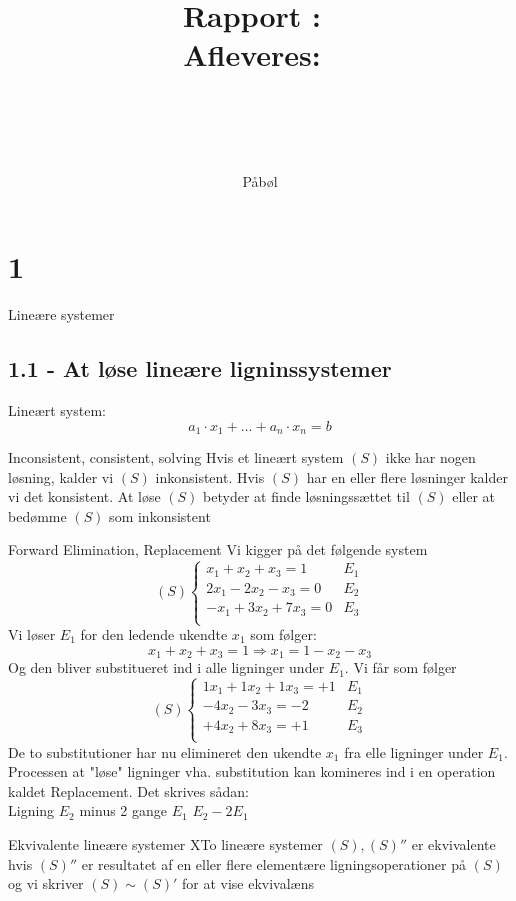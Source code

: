 \documentclass[a4paper,fleqn]{article}
\title{Rapport}
\author{P\aa b\o l}
\title{
	\vspace{2in}
	\textmd{\textbf{\hmwkClass:\ \hmwkTitle}}\\
	\normalsize\vspace{0.1in}\small{Afleveres:\ \hmwkDueDate}\\
	\vspace{0.1in}\large{\textit{\hmwkClassInstructor}}\\
	\normalsize\vspace{0.5in} \hmwkProblem  \\
	\vspace{3in}
}
\author{\textbf{\hmwkAuthorName}}
\begin{document}
	\maketitle
	\newpage
	\tableofcontents
	\setcounter{page}{1}
	\section{1}{Lineære systemer}
	\subsection{1.1 - At løse lineære ligninssystemer}
	Lineært system: \[ a_1 \cdot x_1 + \dots + a_n \cdot x_n = b \]
	\begin{definition}{Inconsistent, consistent, solving}{}
		Hvis et lineært system $(S)$ ikke har nogen løsning, kalder vi $(S)$ inkonsistent.
		Hvis $(S)$ har en eller flere løsninger kalder vi det konsistent.
		At løse $(S)$ betyder at finde løsningssættet til $(S)$ eller at bedømme $(S)$ som
		inkonsistent
	\end{definition}
	\begin{example}{Forward Elimination, Replacement}{}
		Vi kigger på det følgende system 
		\[
			(S) \left\{\begin{array}{rr}
					x_1 + x_2 + x_3 = 1 & E_1\\
					2x_1 - 2x_2 - x_3 = 0 & E_2\\
					-x_1+3x_2+7x_3 = 0 & E_3\\
			\end{array}\right. 
		\]
		Vi løser $E_1$ for den ledende ukendte $x_1$ som følger:
		\[ x_1 + x_2 + x_3 = 1 \Rightarrow x_1 = 1 - x_2 - x_3\]
		Og den bliver substitueret ind i alle ligninger under $E_1$. Vi får som følger
		\[
			(S) \left\{\begin{array}{rr}
					1x_1 + 1x_2 + 1x_3 = +1 & E_1\\
					- 4x_2 - 3x_3 = -2 & E_2\\
					+4x_2+8x_3 = +1 & E_3\\
			\end{array}\right. 
		\]
		De to substitutioner har nu elimineret den ukendte $x_1$ fra elle ligninger under
		$E_1$.\\
		Processen at "løse" ligninger vha. substitution kan komineres ind i en operation
		kaldet Replacement. Det skrives sådan:\\
		Ligning $E_2$ minus 2 gange $E_1$ $E_2 - 2E_1$
	\end{example}
	\begin{definition}{Ekvivalente lineære systemer}{}
		XTo lineære systemer $(S), (S)''$ er ekvivalente hvis $(S)''$ er resultatet af
		en eller flere elementære ligningsoperationer på $(S)$ og vi skriver $(S)\sim(S)'$
		for at vise ekvivalæns
	\end{definition}
	
\end{document}
